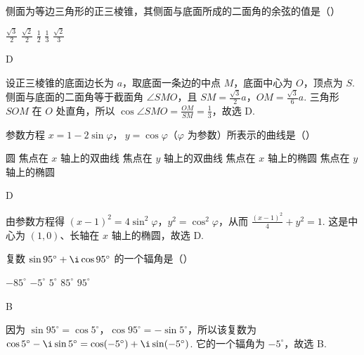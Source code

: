 \documentclass[UTF8,a4paper,oneside,11pt]{ctexbook}
\begin{document}
\begin{problem}

侧面为等边三角形的正三棱锥，其侧面与底面所成的二面角的余弦的值是（\quad）

\choicesfive
    {\(\frac{\sqrt{3}}{2} \)}
    {\(\frac{\sqrt{2}}{2} \)}
    {\(\frac{1}{2} \)}
    {\(\frac{1}{3} \)}
    {\(\frac{\sqrt{2}}{3} \)}
\end{problem}

\begin{answer}
D
\end{answer}

\begin{solution}
设正三棱锥的底面边长为 \(a\)，取底面一条边的中点 \(M\)，底面中心为 \(O\)，顶点为 \(S\). 侧面与底面的二面角等于截面角 \(\angle SMO\)，且 \(SM=\frac{\sqrt{3}}{2}a\)，\(OM=\frac{\sqrt{3}}{6}a\). 三角形 \(SOM\) 在 \(O\) 处直角，所以 \(\cos\angle SMO=\frac{OM}{SM}=\frac{1}{3}\)，故选 D.
\end{solution}

\begin{problem}

参数方程 \(x = 1 - 2\sin\varphi\)，\(\ y = \cos\varphi\)（\(\varphi \) 为参数）所表示的曲线是（\quad）

\choicesfive
    {圆}
    {焦点在 \(x\) 轴上的双曲线}
    {焦点在 \(y\) 轴上的双曲线}
    {焦点在 \(x\) 轴上的椭圆}
    {焦点在 \(y\) 轴上的椭圆}
\end{problem}

\begin{answer}
D
\end{answer}

\begin{solution}
由参数方程得 \((x-1)^2=4\sin^2\varphi\)，\(y^2=\cos^2\varphi\)，从而 \(\frac{(x-1)^2}{4}+y^2=1\). 这是中心为 \((1,0)\)、长轴在 \(x\) 轴上的椭圆，故选 D.
\end{solution}

\begin{problem}

复数 \(\sin95^{\circ}+\i\cos95^{\circ} \) 的一个辐角是（\quad）

\choicesfive
    {\(-85^{\circ} \)}
    {\(-5^{\circ} \)}
    {\(5^{\circ} \)}
    {\(85^{\circ} \)}
    {\(95^{\circ} \)}
\end{problem}

\begin{answer}
B
\end{answer}

\begin{solution}
因为 \(\sin95^{\circ}=\cos5^{\circ}\)，\(\cos95^{\circ}=-\sin5^{\circ}\)，所以该复数为 \(\cos5^{\circ}-\i\sin5^{\circ}=\cos(-5^{\circ})+\i\sin(-5^{\circ})\). 它的一个辐角为 \(-5^{\circ}\)，故选 B.
\end{solution}
\end{document}
